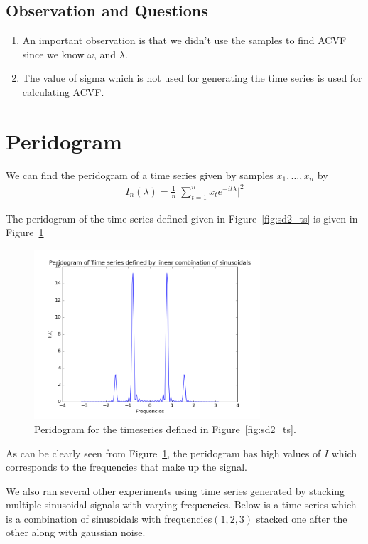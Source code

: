 \documentclass{article}
\begin{document}
\subsection{Observation and Questions}
\begin{enumerate}
  \item An important observation is that we didn't use the samples to find ACVF since we know $\omega$, and $\lambda$.
  \item The value of sigma which is not used for generating the time series is used for calculating ACVF\@.
\end{enumerate}

\section{Peridogram}
We can find the peridogram of a time series given by samples ${x_{1}, \ldots, x_{n}}$ by
\begin{align}
  I_{n}(\lambda) = \frac{1}{n} \lvert\sum_{t=1}^{n} x_{t}e^{-it\lambda} \rvert^{2}
\end{align}

The peridogram of the time series defined given in Figure~\ref{fig:sd2_ts} is given in Figure~\ref{fig:sd2_peri1}

\begin{figure}[ht!]
  \centering
  \includegraphics[width=0.75\textwidth]{images/spectral_density_2/peri1}
  \caption{Peridogram for the timeseries defined in Figure~\ref{fig:sd2_ts}.\label{fig:sd2_peri1}}
\end{figure}

As can be clearly seen from Figure~\ref{fig:sd2_peri1}, the peridogram has high values of $I$ which corresponds to the frequencies that make up the signal.

We also ran several other experiments using time series generated by stacking multiple sinusoidal signals with varying frequencies.  Below is a time series which is a combination of sinusoidals with frequencies$(1, 2, 3)$ stacked one after the other along with gaussian noise.
\end{document}
